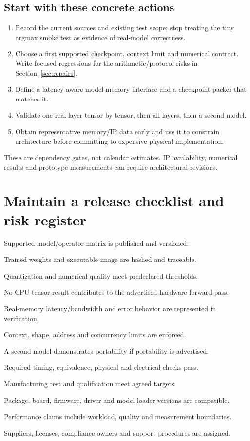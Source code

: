 \documentclass[11pt,a4paper]{article}
\newcommand{\phase}[2]{\clearpage\section{#1}\label{#2}}
\begin{document}
\subsection*{Start with these concrete actions}
\begin{enumerate}
\item Record the current sources and existing test scope; stop treating the tiny
argmax smoke test as evidence of real-model correctness.
\item Choose a first supported checkpoint, context limit and numerical contract.
Write focused regressions for the arithmetic/protocol risks in Section~\ref{sec:repairs}.
\item Define a latency-aware model-memory interface and a checkpoint packer that matches it.
\item Validate one real layer tensor by tensor, then all layers, then a second model.
\item Obtain representative memory/IP data early and use it to constrain architecture
before committing to expensive physical implementation.
\end{enumerate}
These are dependency gates, not calendar estimates. IP availability, numerical
results and prototype measurements can require architectural revisions.

\phase{Maintain a release checklist and risk register}{sec:release}
\begin{checklist}
\item Supported-model/operator matrix is published and versioned.
\item Trained weights and executable image are hashed and traceable.
\item Quantization and numerical quality meet predeclared thresholds.
\item No CPU tensor result contributes to the advertised hardware forward pass.
\item Real-memory latency/bandwidth and error behavior are represented in verification.
\item Context, shape, address and concurrency limits are enforced.
\item A second model demonstrates portability if portability is advertised.
\item Required timing, equivalence, physical and electrical checks pass.
\item Manufacturing test and qualification meet agreed targets.
\item Package, board, firmware, driver and model loader versions are compatible.
\item Performance claims include workload, quality and measurement boundaries.
\item Suppliers, licenses, compliance owners and support procedures are assigned.
\end{checklist}
\end{document}
